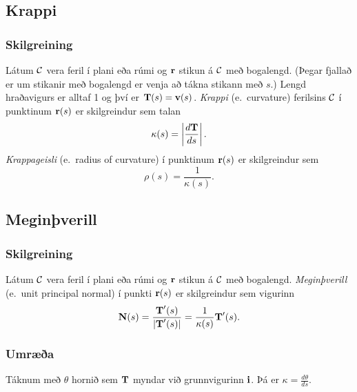 \subsection{Krappi}
 \subsubsection{Skilgreining }
   Látum $\cal C$ vera feril í plani eða rúmi og
$\mbox{${\bf r}$}$ stikun á $\cal C$ með bogalengd.  (Þegar fjallað er um stikanir
með bogalengd er venja að tákna stikann með $s$.) Lengd hraðavigurs
 er alltaf 1 og
því er $\mbox{${\bf T}$}(s)=\mbox{${\bf v}$}(s)$.   {\em Krappi} (e.~curvature) ferilsins $\cal
C$ í punktinum $\mbox{${\bf r}$}(s)$ er skilgreindur sem talan 
$$\kappa(s)=\left|\frac{d\mbox{${\bf T}$}}{ds}\right|.$$
{\em Krappageisli} (e.~radius of curvature) í punktinum $\mbox{${\bf r}$}(s)$ er
skilgreindur sem  
$$\rho(s)=\frac{1}{\kappa(s)}.$$
 



\subsection{Meginþverill}
 \subsubsection{Skilgreining }
   Látum $\cal C$ vera feril í plani eða rúmi og $\mbox{${\bf r}$}$ stikun á $\cal C$ með bogalengd.  {\em Meginþverill} (e.~unit principal normal) í punkti $\mbox{${\bf r}$}(s)$ er skilgreindur sem vigurinn 
$$\mbox{${\bf N}$}(s)=\frac{\mbox{${\bf T}$}'(s)}{|\mbox{${\bf T}$}'(s)|}=\frac{1}{\kappa(s)}\mbox{${\bf T}$}'(s).$$
 


 \subsubsection{Umræða}
  Táknum með $\theta$ hornið sem $\mbox{${\bf T}$}$ myndar við grunnvigurinn $\mbox{${\bf i}$}$. Þá er $\kappa = \frac{d\theta}{ds}$.
 
 \begin{figure} [h]
\begin {center}  \end {center}
\end {figure}      



